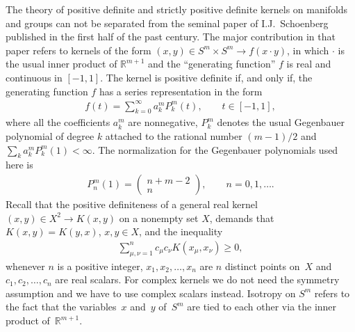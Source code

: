 The theory of positive def\/inite and strictly positive def\/inite kernels on manifolds and groups can not be separated from the seminal paper of I.J.~Schoenberg~\cite{schoen} published in the f\/irst half of the past century. The major contribution in that paper refers to kernels of the form $(x,y) \in S^m \times S^m \to f(x \cdot y)$, in which $\cdot$ is the usual inner product of $\mathbb{R}^{m+1}$ and the ``generating function'' $f$ is real and continuous in $[-1,1]$. The kernel is positive def\/inite if, and only if, the generating function $f$ has a series representation in the form
\begin{gather*}
f(t)=\sum_{k=0}^{\infty}a_{k}^mP_{k}^m(t),\qquad t \in [-1,1],
\end{gather*}
where all the coef\/f\/icients $a_k^m$ are nonnegative, $P_k^m$ denotes the usual Gegenbauer polynomial of degree $k$ attached to the rational number $(m-1)/2$ and $\sum_{k}a_k^m P_k^m(1)<\infty$. The normalization for the Gegenbauer polynomials used here is
\begin{gather*}
P_n^m(1)=\left(\begin{matrix} n+m-2 \\ n \end{matrix} \right),\qquad n=0,1,\ldots.
\end{gather*}
Recall that the positive def\/initeness of a general real kernel $(x,y) \in X^2 \to K(x,y)$ on a nonempty set $X$, demands that $K(x,y)=K(y,x)$, $x,y\in X$, and the inequality
\begin{gather*} \sum_{\mu,\nu=1}^nc_\mu c_\nu K(x_\mu , x_\nu)\geq 0,
\end{gather*}
whenever $n$ is a positive integer, $x_1, x_2, \ldots, x_n$ are $n$ distinct points on~$X$ and $c_1, c_2, \ldots, c_n$ are real scalars. For complex kernels we do not need the symmetry assumption and we have to use complex scalars instead. Isotropy on $S^m$ refers to the fact that the variables~$x$ and~$y$ of~$S^m$ are tied to each other via the inner product of~$\mathbb{R}^{m+1}$.

